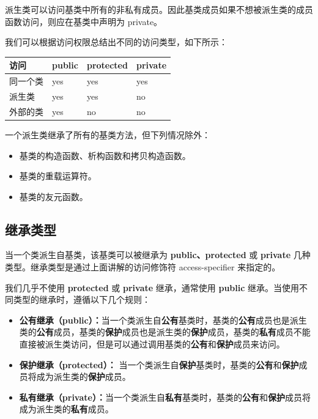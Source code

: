 \documentclass[
]{article}
\providecommand{\tightlist}{%
  \setlength{\itemsep}{0pt}\setlength{\parskip}{0pt}}
\begin{document}
派生类可以访问基类中所有的非私有成员。因此基类成员如果不想被派生类的成员函数访问，则应在基类中声明为
private。

我们可以根据访问权限总结出不同的访问类型，如下所示：

\begin{longtable}[]{@{}llll@{}}
\toprule
访问 & public & protected & private \\
\midrule
\endhead
同一个类 & yes & yes & yes \\
派生类 & yes & yes & no \\
外部的类 & yes & no & no \\
\bottomrule
\end{longtable}

一个派生类继承了所有的基类方法，但下列情况除外：

\begin{itemize}
\tightlist
\item
  基类的构造函数、析构函数和拷贝构造函数。
\item
  基类的重载运算符。
\item
  基类的友元函数。
\end{itemize}

\hypertarget{ux7ee7ux627fux7c7bux578b}{%
\subsection{继承类型}\label{ux7ee7ux627fux7c7bux578b}}

当一个类派生自基类，该基类可以被继承为 \textbf{public、protected} 或
\textbf{private} 几种类型。继承类型是通过上面讲解的访问修饰符
access-specifier 来指定的。

我们几乎不使用 \textbf{protected} 或 \textbf{private} 继承，通常使用
\textbf{public} 继承。当使用不同类型的继承时，遵循以下几个规则：

\begin{itemize}
\tightlist
\item
  \textbf{公有继承（public）：}当一个类派生自\textbf{公有}基类时，基类的\textbf{公有}成员也是派生类的\textbf{公有}成员，基类的\textbf{保护}成员也是派生类的\textbf{保护}成员，基类的\textbf{私有}成员不能直接被派生类访问，但是可以通过调用基类的\textbf{公有}和\textbf{保护}成员来访问。
\item
  \textbf{保护继承（protected）：}
  当一个类派生自\textbf{保护}基类时，基类的\textbf{公有}和\textbf{保护}成员将成为派生类的\textbf{保护}成员。
\item
  \textbf{私有继承（private）：}当一个类派生自\textbf{私有}基类时，基类的\textbf{公有}和\textbf{保护}成员将成为派生类的\textbf{私有}成员。
\end{itemize}
\end{document}
